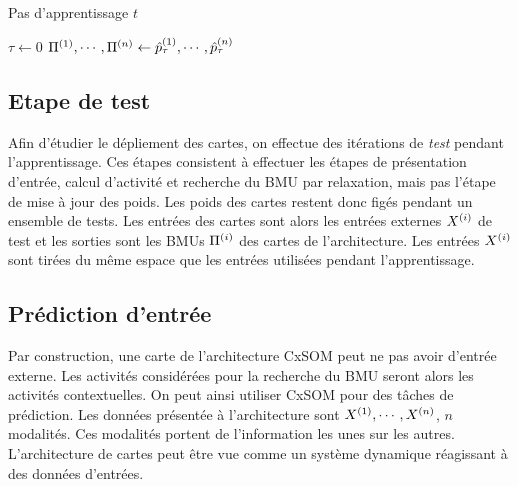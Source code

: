 \begin{algorithm}\label{algo:cxsom}
\caption{Pas d'apprentissage $t$}
\SetAlgoLined
  $\tau \leftarrow 0$ \;
  $\Pi^{({1})}, \cdots, \Pi^{({n})} \leftarrow \hat{p}^{({1})}_\tau, \cdots , \hat{p}^{({n})}_\tau$ \;
 \end{algorithm}
\subsection{Etape de test}

Afin d'étudier le dépliement des cartes, on effectue des itérations de \emph{test} pendant l'apprentissage. Ces étapes consistent à effectuer les étapes de présentation d'entrée, calcul d'activité et recherche du BMU par relaxation, mais pas l'étape de mise à jour des poids. Les poids des cartes restent donc figés pendant un ensemble de tests. Les entrées des cartes sont alors les entrées externes $X^{({i})}$ de test et les sorties sont les BMUs $\Pi^{({i})}$ des cartes de l'architecture. 
Les entrées $X^{({i})}$ sont tirées du même espace que les entrées utilisées pendant l'apprentissage.

\subsection{Prédiction d'entrée}
Par construction, une carte de l'architecture CxSOM peut ne pas avoir d'entrée externe. Les activités considérées pour la recherche du BMU seront alors les activités contextuelles. On peut ainsi utiliser CxSOM pour des tâches de prédiction. Les données présentée à l'architecture sont $X^{({1})}, \cdots, X^{({n})}$, $n$ modalités. Ces modalités portent de l'information les unes sur les autres. 
L'architecture de cartes peut être vue comme un système dynamique réagissant à des données d'entrées.


